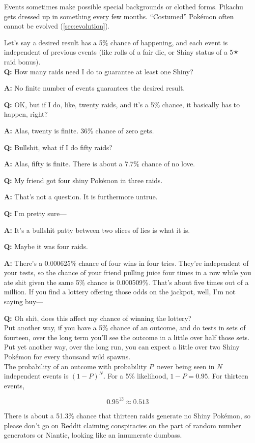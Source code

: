 Events sometimes make possible special backgrounds or clothed forms.
Pikachu gets dressed up in something every few months.
``Costumed'' Pokémon often cannot be evolved (\autoref{sec:evolution}).
\clearpage
\begin{tipbox}[title=An aside regarding independent events,title style={color=Green!50!black}]
Let's say a desired result has a 5\% chance of happening, and each event is independent of previous events (like rolls of a fair die, or Shiny status of a 5🟉 raid bonus).\\

\textbf{Q:} How many raids need I do to guarantee at least one Shiny?

\textbf{A:} No finite number of events guarantees the desired result.

\textbf{Q:} OK, but if I do, like, twenty raids, and it's a 5\% chance, it basically has to happen, right?

\textbf{A:} Alas, twenty is finite. 36\% chance of zero gets.

\textbf{Q:} Bullshit, what if I do fifty raids?

\textbf{A:} Alas, fifty is finite. There is about a 7.7\% chance of no love.

\textbf{Q:} My friend got four shiny Pokémon in three raids.

\textbf{A:} That's not a question. It is furthermore untrue.

\textbf{Q:} I'm pretty sure---

\textbf{A:} It's a bullshit patty between two slices of lies is what it is.

\textbf{Q:} Maybe it was four raids.

\textbf{A:} There's a 0.000625\% chance of four wins in four tries. They're independent of your tests,
             so the chance of your friend pulling juice four times in a row while you ate shit given
             the same 5\% chance is 0.000509\%. That's about five times out of a million.
             If you find a lottery offering those odds on the jackpot, well, I'm not saying buy---

\textbf{Q:} Oh shit, does this affect my chance of winning the lottery?\\

Put another way, if you have a 5\% chance of an outcome, and do tests in sets of fourteen,
 over the long term you'll see the outcome in a little over half those sets.
Put yet another way, over the long run, you can expect a little over two Shiny
 Pokémon for every thousand wild spawns.\\

The probability of an outcome with probability $P$\, never being seen in $N$ independent
  events is ${(1 - P)}^N$. For a 5\% likelihood, $1 - P = 0.95$. For thirteen events,

  \[ 0.95^{13} ≈ 0.513 \]

There is about a 51.3\% chance that thirteen raids generate no Shiny Pokémon,
  so please don't go on Reddit claiming conspiracies on the part of
  random number generators or Niantic, looking like an innumerate dumbass.
\end{tipbox}
\pagecolor{black}
